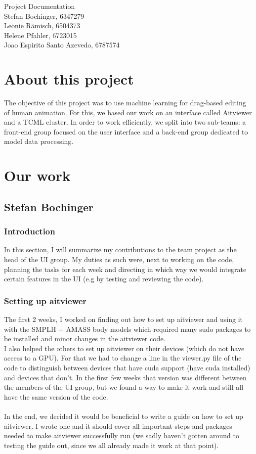 \documentclass[a4paper]{scrartcl}
\def\header#1#2{
  \begin{center}
    {\Large Project Documentation}\\
    {Stefan Bochinger, 6347279}\\
    {Leonie Rämisch, 6504373}\\
    {Helene Pfahler, 6723015}\\
    {Joao Espirito Santo Azevedo, 6787574}
  \end{center}
}
\begin{document}
\header{Nr. \NUMBER}{\DEADLINE}

\section*{About this project}
The objective of this project was to use machine learning for drag-based editing of human animation. For this, we based our work on an interface called Aitviewer and a TCML cluster. 
In order to work efficiently, we split into two sub-teams: a front-end group focused on the user interface and a back-end group dedicated to model data processing.  

\section*{Our work}

\subsection*{Stefan Bochinger}
\subsubsection*{Introduction}
In this section, I will summarize my contributions to the team project as the head of the UI group. My duties as such were, next to working on the code, planning the tasks for each week and directing in which way we would integrate certain features in the UI (e.g by testing and reviewing the code).

\subsubsection*{Setting up aitviewer}
The first 2 weeks, I worked on finding out how to set up aitviewer and using it with the SMPLH + AMASS body models which required many sudo packages to be installed and minor changes in the aitviewer code.\\
I also helped the others to set up aitviewer on their devices (which do not have access to a GPU). For that we had to change a line in the viewer.py file of the code to distinguish between devices that have cuda support (have cuda installed) and devices that don't. In the first few weeks that version was different between the members of the UI group, but we found a way to make it work and still all have the same version of the code.\\\\
In the end, we decided it would be beneficial to write a guide on how to set up aitviewer. I wrote one and it should cover all important steps and packages needed to make aitviewer successfully run (we sadly haven't gotten around to testing the guide out, since we all already made it work at that point).
\end{document}
